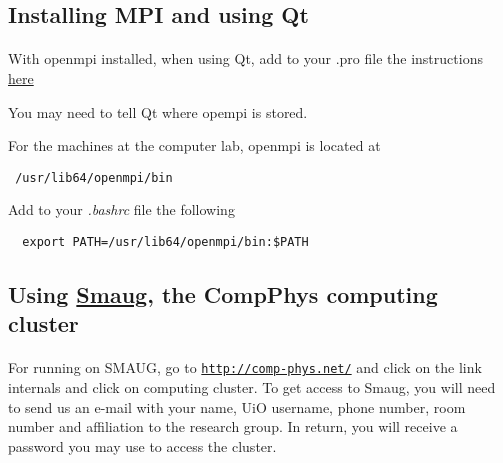 \documentclass[%
oneside,                 %
final,                   %
10pt]{article}
\begin{document}
\subsection*{Installing MPI and using Qt}

\paragraph{}
With openmpi installed, when using Qt, add to your .pro file the instructions \href{{http://dragly.org/2012/03/14/developing-mpi-applications-in-qt-creator/}}{here}

You may need to tell Qt where opempi is stored.

For the machines at the computer lab, openmpi is located  at 
\begin{verbatim}
 /usr/lib64/openmpi/bin
\end{verbatim}
Add to your \emph{.bashrc} file the following
\begin{verbatim}
  export PATH=/usr/lib64/openmpi/bin:$PATH 
\end{verbatim}




\subsection*{Using \href{{http://comp-phys.net/cluster-info/using-smaug/}}{Smaug}, the CompPhys computing cluster}

\paragraph{}
For running on SMAUG, go to \href{{http://comp-phys.net/}}{\nolinkurl{http://comp-phys.net/}} and click on the link internals and click on
computing cluster.
To get access to Smaug, you will need to send us an e-mail with your name, UiO username, phone number, room number and affiliation to the research group. In return, you will receive a password you may use to access the cluster.
\end{document}
